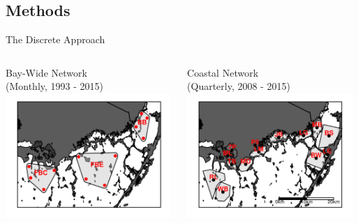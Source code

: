 \documentclass[compress,noflama,nosectionpages]{beamer}
\begin{document}
\subsection{Methods}
\begin{frame}{The Discrete Approach}
	\begin{columns}
		\begin{column}[c]{5.5cm}
			\begin{center}
			Bay-Wide Network\\ (Monthly, 1993 - 2015)
			\includegraphics[height=4.7cm,clip=true,trim = 0mm 0mm 0mm 0mm,keepaspectratio=true]{figures/fbmap_wqmn.png}%
			\end{center}
		\end{column}
	
		\begin{column}[c]{6cm}
			\begin{center}
			Coastal Network\\ (Quarterly, 2008 - 2015)
			\includegraphics[height=4.7cm,clip=true,trim = 0mm 0mm 0mm 0mm,keepaspectratio=true]{figures/fbmap_dflow.png}%
			\end{center}
		\end{column}
	\end{columns}
\end{frame}
\end{document}
